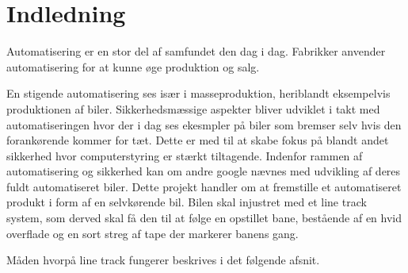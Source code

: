 \section{Indledning}

Automatisering er en stor del af samfundet den dag i dag. Fabrikker anvender automatisering for at kunne øge produktion og salg.

En stigende automatisering ses især i masseproduktion, heriblandt eksempelvis produktionen af biler. \newline
Sikkerhedsmæssige aspekter bliver udviklet i takt med automatiseringen hvor der i dag ses ekesmpler på biler som bremser selv hvis den forankørende kommer for tæt. 
Dette er med til at skabe fokus på blandt andet sikkerhed hvor computerstyring er stærkt tiltagende. Indenfor rammen af automatisering og sikkerhed kan om andre google nævnes med udvikling af deres fuldt automatiseret biler.
\newline
\newline
Dette projekt handler om at fremstille et automatiseret produkt i form af en selvkørende bil. Bilen skal injustret med et line track system, som derved skal få den til at følge en opstillet bane, bestående af en hvid overflade og en sort streg af tape der markerer banens gang.\newline

Måden hvorpå line track fungerer beskrives i det følgende afsnit.